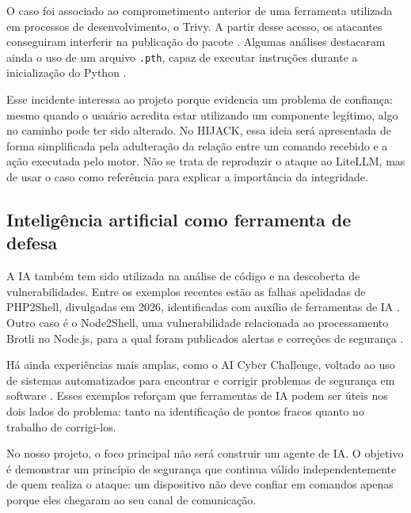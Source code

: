 \documentclass[12pt,a4paper]{article}
\begin{document}
O caso foi associado ao comprometimento anterior de uma ferramenta utilizada
em processos de desenvolvimento, o Trivy. A partir desse acesso, os atacantes
conseguiram interferir na publicação do pacote \cite{netenrich2026litellm,
hackernoon2026litellm}. Algumas análises destacaram ainda o uso de um arquivo
\texttt{.pth}, capaz de executar instruções durante a inicialização do Python
\cite{bastion2026litellm}.

Esse incidente interessa ao projeto porque evidencia um problema de confiança:
mesmo quando o usuário acredita estar utilizando um componente legítimo, algo
no caminho pode ter sido alterado. No HIJACK, essa ideia será apresentada de
forma simplificada pela adulteração da relação entre um comando recebido e
a ação executada pelo motor. Não se trata de reproduzir o ataque ao LiteLLM,
mas de usar o caso como referência para explicar a importância da integridade.

\subsection{Inteligência artificial como ferramenta de defesa}
A IA também tem sido utilizada na análise de código e na descoberta de
vulnerabilidades. Entre os exemplos recentes estão as falhas apelidadas de
PHP2Shell, divulgadas em 2026, identificadas com auxílio de ferramentas de IA
\cite{wiz2026php2shell,fortune2026php}. Outro caso é o Node2Shell, uma
vulnerabilidade relacionada ao processamento Brotli no Node.js, para a qual
foram publicados alertas e correções de segurança
\cite{socprime2026node,akamai2026node2shell}.

Há ainda experiências mais amplas, como o AI Cyber Challenge, voltado ao uso
de sistemas automatizados para encontrar e corrigir problemas de segurança
em software \cite{drishti2026}. Esses exemplos reforçam que ferramentas de IA
podem ser úteis nos dois lados do problema: tanto na identificação de pontos
fracos quanto no trabalho de corrigi-los.

No nosso projeto, o foco principal não será construir um agente de IA. O
objetivo é demonstrar um princípio de segurança que continua válido
independentemente de quem realiza o ataque: um dispositivo não deve confiar
em comandos apenas porque eles chegaram ao seu canal de comunicação.
\end{document}
